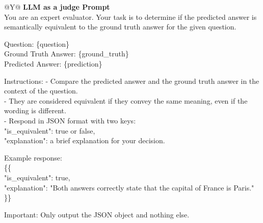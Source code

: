 \documentclass{article}
\theoremstyle{plain}
\theoremstyle{definition}
\theoremstyle{remark}
\begin{document}
\begin{table}[htb]
  \centering
  \caption{Implementation Details of LLM as a judge in Section 4.5 and 4.6}
  \label{tab:llm_as_judge1}
  \begin{tabularx}{\textwidth}{@{}Y@{}}
    \toprule
    \textbf{LLM as a judge Prompt} \\     %
    \midrule
    You are an expert evaluator. Your task is to determine if the predicted answer is semantically equivalent to the ground truth answer for the given question.\\

    \par\medskip
    Question: \{question\} \\
    Ground Truth Answer: \{ground\_truth\} \\
    Predicted Answer: \{prediction\} \\

    \par\medskip
    Instructions:
    - Compare the predicted answer and the ground truth answer in the context of the question.\\
    - They are considered equivalent if they convey the same meaning, even if the wording is different.\\
    - Respond in JSON format with two keys:\\
        "is\_equivalent": true or false,\\
        "explanation": a brief explanation for your decision.\\

    \par\medskip
    Example response:\\
    \{\{ \\
        "is\_equivalent": true,\\
        "explanation": "Both answers correctly state that the capital of France is Paris."\\
    \}\}

    \par\medskip
    Important: Only output the JSON object and nothing else.\\

    \bottomrule
  \end{tabularx}
\end{table}
\end{document}
